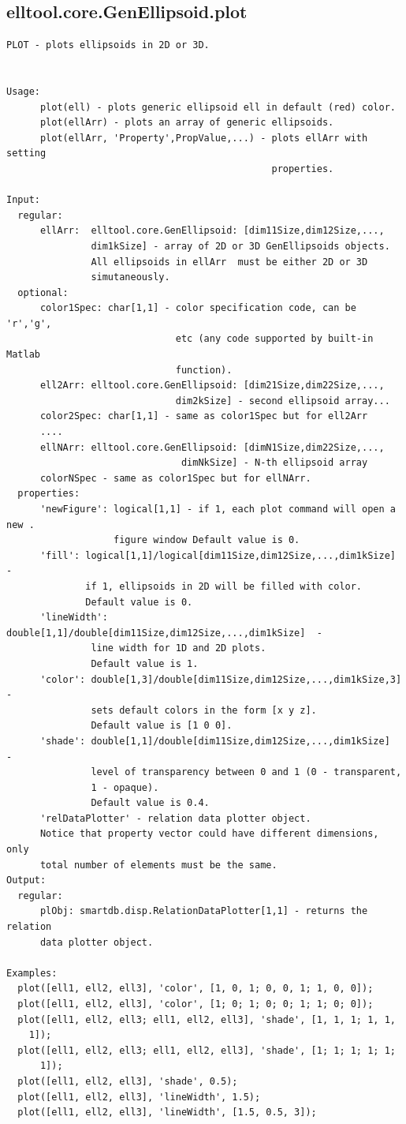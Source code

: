 \documentclass[letterpaper,10pt,english]{sphinxmanual}
\begin{document}
\subsection{elltool.core.GenEllipsoid.plot}
\label{chap_functions:elltool-core-genellipsoid-plot}
\begin{Verbatim}[commandchars=\\\{\}]
PLOT - plots ellipsoids in 2D or 3D.


Usage:
      plot(ell) - plots generic ellipsoid ell in default (red) color.
      plot(ellArr) - plots an array of generic ellipsoids.
      plot(ellArr, 'Property',PropValue,...) - plots ellArr with setting
                                               properties.

Input:
  regular:
      ellArr:  elltool.core.GenEllipsoid: [dim11Size,dim12Size,...,
               dim1kSize] - array of 2D or 3D GenEllipsoids objects.
               All ellipsoids in ellArr  must be either 2D or 3D
               simutaneously.
  optional:
      color1Spec: char[1,1] - color specification code, can be 'r','g',
                              etc (any code supported by built-in Matlab
                              function).
      ell2Arr: elltool.core.GenEllipsoid: [dim21Size,dim22Size,...,
                              dim2kSize] - second ellipsoid array...
      color2Spec: char[1,1] - same as color1Spec but for ell2Arr
      ....
      ellNArr: elltool.core.GenEllipsoid: [dimN1Size,dim22Size,...,
                               dimNkSize] - N-th ellipsoid array
      colorNSpec - same as color1Spec but for ellNArr.
  properties:
      'newFigure': logical[1,1] - if 1, each plot command will open a new .
                   figure window Default value is 0.
      'fill': logical[1,1]/logical[dim11Size,dim12Size,...,dim1kSize]  -
              if 1, ellipsoids in 2D will be filled with color.
              Default value is 0.
      'lineWidth': double[1,1]/double[dim11Size,dim12Size,...,dim1kSize]  -
               line width for 1D and 2D plots.
               Default value is 1.
      'color': double[1,3]/double[dim11Size,dim12Size,...,dim1kSize,3] -
               sets default colors in the form [x y z].
               Default value is [1 0 0].
      'shade': double[1,1]/double[dim11Size,dim12Size,...,dim1kSize]  -
               level of transparency between 0 and 1 (0 - transparent,
               1 - opaque).
               Default value is 0.4.
      'relDataPlotter' - relation data plotter object.
      Notice that property vector could have different dimensions, only
      total number of elements must be the same.
Output:
  regular:
      plObj: smartdb.disp.RelationDataPlotter[1,1] - returns the relation
      data plotter object.

Examples:
  plot([ell1, ell2, ell3], 'color', [1, 0, 1; 0, 0, 1; 1, 0, 0]);
  plot([ell1, ell2, ell3], 'color', [1; 0; 1; 0; 0; 1; 1; 0; 0]);
  plot([ell1, ell2, ell3; ell1, ell2, ell3], 'shade', [1, 1, 1; 1, 1,
    1]);
  plot([ell1, ell2, ell3; ell1, ell2, ell3], 'shade', [1; 1; 1; 1; 1;
      1]);
  plot([ell1, ell2, ell3], 'shade', 0.5);
  plot([ell1, ell2, ell3], 'lineWidth', 1.5);
  plot([ell1, ell2, ell3], 'lineWidth', [1.5, 0.5, 3]);
\end{Verbatim}
\end{document}
